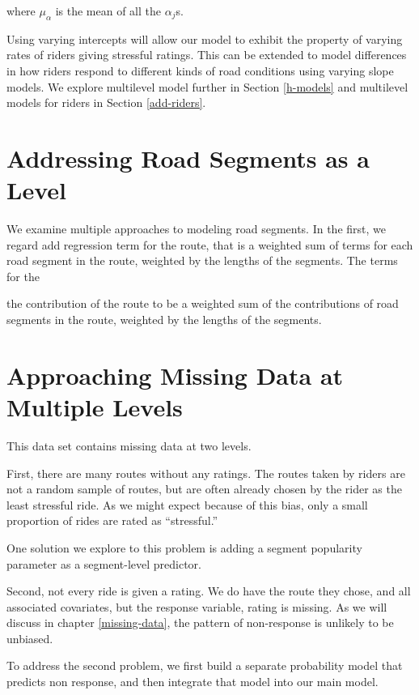 \documentclass[12pt,twoside]{reedthesis}
\begin{document}
  where \(\mu_\alpha\) is the mean of all the \(\alpha_j\)s.
  
  Using varying intercepts will allow our model to exhibit the property of
  varying rates of riders giving stressful ratings. This can be extended
  to model differences in how riders respond to different kinds of road
  conditions using varying slope models. We explore multilevel model
  further in Section \autoref{h-models} and multilevel models for riders
  in Section \autoref{add-riders}.
  
  \section{Addressing Road Segments as a
  Level}\label{addressing-road-segments-as-a-level}
  
  We examine multiple approaches to modeling road segments. In the first,
  we regard add regression term for the route, that is a weighted sum of
  terms for each road segment in the route, weighted by the lengths of the
  segments. The terms for the
  
  the contribution of the route to be a weighted sum of the contributions
  of road segments in the route, weighted by the lengths of the segments.
  
  \section{Approaching Missing Data at Multiple
  Levels}\label{approaching-missing-data-at-multiple-levels}
  
  This data set contains missing data at two levels.
  
  First, there are many routes without any ratings. The routes taken by
  riders are not a random sample of routes, but are often already chosen
  by the rider as the least stressful ride. As we might expect because of
  this bias, only a small proportion of rides are rated as ``stressful.''
  
  One solution we explore to this problem is adding a segment popularity
  parameter as a segment-level predictor.
  
  Second, not every ride is given a rating. We do have the route they
  chose, and all associated covariates, but the response variable, rating
  is missing. As we will discuss in chapter \autoref{missing-data}, the
  pattern of non-response is unlikely to be unbiased.
  
  To address the second problem, we first build a separate probability
  model that predicts non response, and then integrate that model into our
  main model.
  
\end{document}
